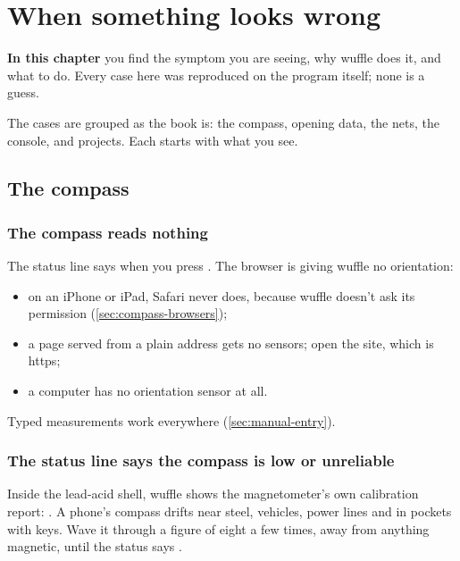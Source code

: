 \chapter{When something looks wrong}\label{ch:trouble}
\begin{goals}
\textbf{In this chapter} you find the symptom you are seeing, why wuffle does it, and what to do. Every
case here was reproduced on the program itself; none is a guess.
\end{goals}

The cases are grouped as the book is: the compass, opening data, the nets, the console, and projects.
Each starts with what you see.

\section{The compass}\label{sec:trouble-field}

\subsection{The compass reads nothing}

The status line says  when you press
. The browser is giving wuffle no orientation:

\begin{itemize}
\item on an iPhone or iPad, Safari never does, because wuffle doesn't ask its permission
(\cref{sec:compass-browsers});
\item a page served from a plain  address gets no sensors; open the site, which is https;
\item a computer has no orientation sensor at all.
\end{itemize}

Typed measurements work everywhere (\cref{sec:manual-entry}).

\subsection{The status line says the compass is low or unreliable}

Inside the lead-acid shell, wuffle shows the magnetometer's own calibration report:
. A phone's compass drifts near steel,
vehicles, power lines and in pockets with keys. Wave it through a figure of eight a few times, away from
anything magnetic, until the status says .

